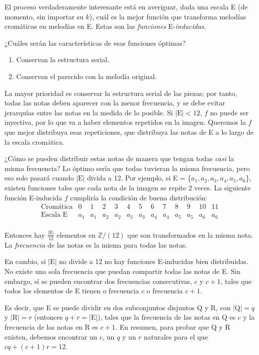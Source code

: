 		El proceso verdaderamente interesante está en averiguar, dada una escala E (de momento, sin importar su $k$), cuál es la mejor función que transforma melodías cromáticas en melodías en E. Estas son las \textit{funciones} E-\textit{inducidas}. 
		
		¿Cuáles serán las características de esas funciones óptimas?
		
		\begin{enumerate}
			\item Conservan la estructura serial.
			\item Conservan el parecido con la melodía original.
		\end{enumerate}
		
		La mayor prioridad es conservar la estructura serial de las piezas; por tanto, todas las notas deben aparecer con la menor frecuencia, y se debe evitar jerarquías entre las notas en la medida de lo posible. Si $|\text{E}|<12$, $f$ no puede ser inyectiva, por lo que va a haber elementos repetidos en la imagen. Queremos la $f$ que mejor distribuya esas repeticiones, que distribuya las notas de E a lo largo de la escala cromática.
		
		¿Cómo se pueden distribuir estas notas de manera que tengan todas \textit{casi} la misma frecuencia? Lo óptimo sería que todas tuvieran la misma frecuencia, pero eso solo pasará cuando $|\text{E}|$ divida a 12. Por ejemplo, si E = \{$a_1,a_2,a_3,a_4,a_5,a_6$\}, existen funciones tales que cada nota de la imagen se repite 2 veces. La siguiente función E-inducida $f$ cumpliría la condición de buena distribución:
		$$\left.\begin{matrix}
		\text{Cromática}&0&1&2&3&4&5&6&7&8&9&10&11\\
		\text{Escala E}&a_1&a_1&a_2&a_2&a_3&a_3&a_4&a_4&a_5&a_5&a_6&a_6\\
		\end{matrix}\right.$$
		
		Entonces hay $\frac{|\text{E}|}{12}$ elementos en $\mathbb{Z}/(12)$ que son transformados en la misma nota. La \textit{frecuencia} de las notas es la misma para todas las notas.
		
		En cambio, si $|\text{E}|$ no divide a 12 no hay funciones E-inducidas bien distribuidas. No existe una sola frecuencia que puedan compartir todas las notas de E. Sin embargo, sí se pueden encontrar dos frecuencias consecutivas, $c$ y $c+1$, tales que todos los elementos de E tienen o frecuencia $c$ o frecuencia $c+1$.
		
		Es decir, que E se puede dividir en dos subconjuntos disjuntos Q y R, con $|\text{Q}|=q$ y $|\text{R}|=r$ (entonces $q+r=|\text{E}|$), tales que la frecuencia de las notas en Q es $c$ y la frecuencia de las notas en R es $c+1$. En resumen, para probar que Q y R existen, debemos encontrar un $c$, un $q$ y un $r$ naturales para el que $cq + (c+1)r=12$.
		
